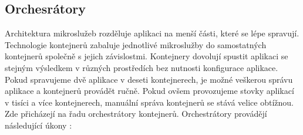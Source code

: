 \subsection{Orchesrátory}
Architektura mikroslužeb rozděluje aplikaci na menší části, které se lépe spravují. Technologie kontejnerů zabaluje jednotlivé mikroslužby do samostatných kontejnerů \linebreak společně s jejich závislostmi. Kontejnery dovolují spustit aplikaci se stejným výsledkem v různých prostředích bez nutnosti konfigurace aplikace. Pokud spravujeme dvě aplikace v deseti kontejnerech, je možné veškerou správu aplikace a kontejnerů provádět ručně. Pokud ovšem provozujeme stovky aplikací v tisíci a více kontejnerech, manuální správa kontejnerů se stává velice obtížnou. Zde přicházejí na řadu orchestrátory kontejnerů. Orchestrátory provádějí následující úkony \cite{container-orchestration}:

